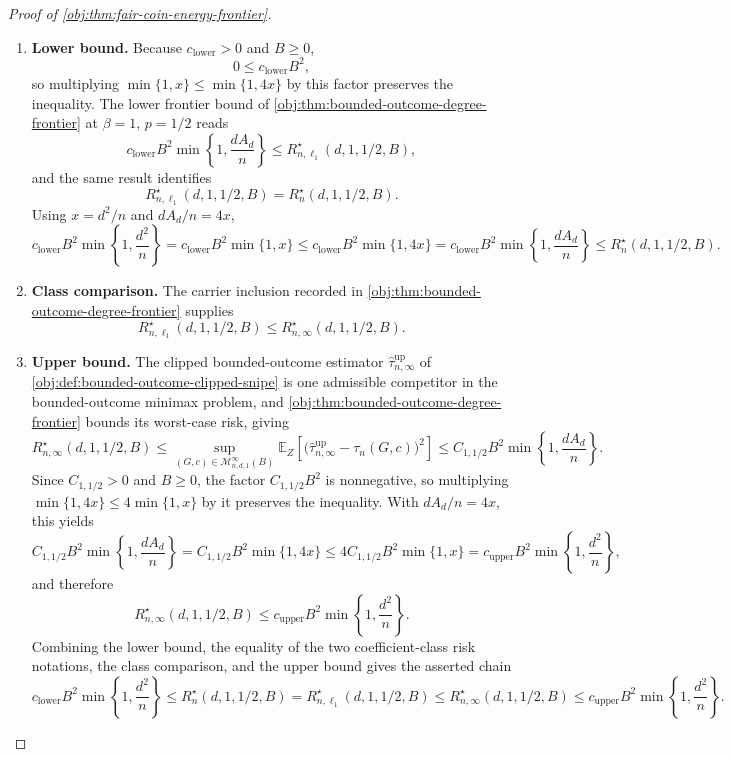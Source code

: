 \documentclass[11pt]{article}
\begin{document}
\begin{proof}[Proof of \cref{obj:thm:fair-coin-energy-frontier}]
\begin{enumerate}
\item \textbf{Lower bound.}
Because \(c_{\mathrm{lower}}>0\) and \(B\ge0\),
\[
0\le c_{\mathrm{lower}}B^2,
\]
so multiplying \(\min\{1,x\}\le\min\{1,4x\}\) by this factor preserves the inequality. %
The lower frontier bound of \cref{obj:thm:bounded-outcome-degree-frontier} at \(\beta=1\), \(p=1/2\) reads
\[
c_{\mathrm{lower}}B^2\min\!\left\{1,\frac{dA_d}{n}\right\}
\le
R_{n,\ell_1}^{\star}(d,1,1/2,B),
\]
and the same result identifies
\[
R_{n,\ell_1}^{\star}(d,1,1/2,B)
=
R_n^\star(d,1,1/2,B).
\]
Using \(x=d^2/n\) and \(dA_d/n=4x\),
\[
c_{\mathrm{lower}}B^2\min\!\left\{1,\frac{d^2}{n}\right\}
=
c_{\mathrm{lower}}B^2\min\{1,x\}
\le
c_{\mathrm{lower}}B^2\min\{1,4x\}
=
c_{\mathrm{lower}}B^2\min\!\left\{1,\frac{dA_d}{n}\right\}
\le
R_n^\star(d,1,1/2,B).
\] %

\item \textbf{Class comparison.}
The carrier inclusion recorded in \cref{obj:thm:bounded-outcome-degree-frontier} supplies
\[
R_{n,\ell_1}^{\star}(d,1,1/2,B)
\le
R_{n,\infty}^{\star}(d,1,1/2,B).
\] %

\item \textbf{Upper bound.}
The clipped bounded-outcome estimator \(\widehat\tau_{n,\infty}^{\mathrm{up}}\) of \cref{obj:def:bounded-outcome-clipped-snipe} is one admissible competitor in the bounded-outcome minimax problem, and \cref{obj:thm:bounded-outcome-degree-frontier} bounds its worst-case risk, giving
\[
R_{n,\infty}^{\star}(d,1,1/2,B)
\le
\sup_{(G,c)\in\mathcal M_{n,d,1}^{\infty}(B)}
\mathbb E_Z\!\left[
\bigl(\widehat\tau_{n,\infty}^{\mathrm{up}}-\tau_n(G,c)\bigr)^2
\right]
\le
C_{1,1/2}B^2\min\!\left\{1,\frac{dA_d}{n}\right\}.
\]
Since \(C_{1,1/2}>0\) and \(B\ge0\), the factor \(C_{1,1/2}B^2\) is nonnegative, so multiplying \(\min\{1,4x\}\le4\min\{1,x\}\) by it preserves the inequality.  With \(dA_d/n=4x\), this yields
\[
C_{1,1/2}B^2\min\!\left\{1,\frac{dA_d}{n}\right\}
=
C_{1,1/2}B^2\min\{1,4x\}
\le
4C_{1,1/2}B^2\min\{1,x\}
=
c_{\mathrm{upper}}B^2\min\!\left\{1,\frac{d^2}{n}\right\},
\]
and therefore
\[
R_{n,\infty}^{\star}(d,1,1/2,B)
\le
c_{\mathrm{upper}}B^2\min\!\left\{1,\frac{d^2}{n}\right\}.
\] %
Combining the lower bound, the equality of the two coefficient-class risk notations, the class comparison, and the upper bound gives the asserted chain
\[
c_{\mathrm{lower}}B^2\min\!\left\{1,\frac{d^2}{n}\right\}
\le
R_n^\star(d,1,1/2,B)
=
R_{n,\ell_1}^\star(d,1,1/2,B)
\le
R_{n,\infty}^\star(d,1,1/2,B)
\le
c_{\mathrm{upper}}B^2\min\!\left\{1,\frac{d^2}{n}\right\}.
\]


\end{enumerate}
\end{proof}
\end{document}
